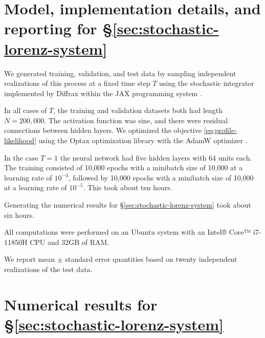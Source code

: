 \documentclass{article} %
\begin{document}



\appendix
\clearpage
\tableofcontents
\clearpage
\section{Model, implementation details, and reporting for \S\ref{sec:stochastic-lorenz-system}}  
\label{sec:implementation-details}
We generated training, validation, and test data by sampling independent realizations of this process at a fixed time step \(T\) using the stochastic integrator \citet{foster_high_2023} implemented by Diffrax \citep{kidger_neural_2021} within the JAX programming system \citep{deepmind_deepmind_2020,kidger_equinox_2021,bradbury_jax_2018}.

In all cases of \(T\), the training and validation datasets both had length \(N=200,000\).
The activation function was sine, and there were residual connections between hidden layers.
We optimized the objective \eqref{eq:profile-likelihood} using the Optax optimization library \citep{deepmind_deepmind_2020}
with the AdamW optimizer \citep{loshchilov_decoupled_2019}.

In the case \(T = 1\) the neural network had five hidden layers with 64 units each.
The training consisted of 10,000 epochs with a minibatch size of 10,000 at a learning rate of \(10^{-4}\), followed by 10,000 epochs with a minibatch size of 10,000 at a learning rate of \(10^{-5}\).
This took about ten hours.

Generating the numerical results for \S\ref{sec:stochastic-lorenz-system} took about six hours.

All computations were performed on an Ubuntu system with an Intel® Core™ i7-11850H CPU and 32GB of RAM.

We report mean \(\pm\) standard error quantities based on twenty independent realizations of the test data.

\clearpage
\section{Numerical results for \S\ref{sec:stochastic-lorenz-system}}
\label{sec:results}



\clearpage
\end{document}
